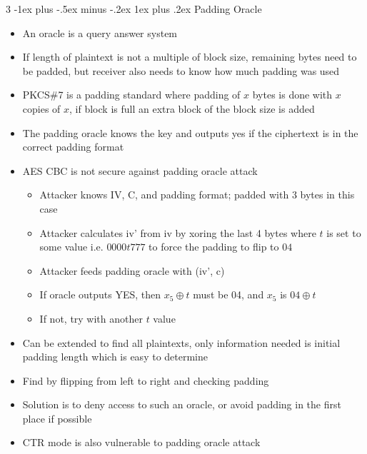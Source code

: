 \documentclass[10pt, landscape]{article}
\makeatletter
\renewcommand{\subsubsection}{\@startsection{subsubsection}{4}{0mm}%
                                {-1ex plus -.5ex minus -.2ex}%
                                {1ex plus .2ex}%
                                {\normalfont\small\bfseries}}%
\makeatother
\begin{document}
\begin{multicols*}{3}
\subsubsection{Padding Oracle}
\begin{itemize}
    \item An oracle is a query answer system
    \item If length of plaintext is not a multiple of block size, remaining bytes need to be padded, but receiver also needs to know how much padding was used
    \item PKCS\#7 is a padding standard where padding of $x$ bytes is done with $x$ copies of $x$, if block is full an extra block of the block size is added
    \item The padding oracle knows the key and outputs yes if the ciphertext is in the correct padding format
    \item AES CBC is not secure against padding oracle attack
    \begin{itemize}
        \item Attacker knows IV, C, and padding format; padded with $3$ bytes in this case
        \item Attacker calculates iv' from iv by xoring the last 4 bytes where $t$ is set to some value i.e. $0000t777$ to force the padding to flip to $04$
        \item Attacker feeds padding oracle with (iv', c)
        \item If oracle outputs YES, then $x_5 \oplus t$ must be 04, and $x_5$ is $04 \oplus t$
        \item If not, try with another $t$ value
    \end{itemize}
    \item Can be extended to find all plaintexts, only information needed is initial padding length which is easy to determine
    \item Find by flipping from left to right and checking padding
    \item Solution is to deny access to such an oracle, or avoid padding in the first place if possible
    \item CTR mode is also vulnerable to padding oracle attack
\end{itemize}


\end{multicols*}
\end{document}
